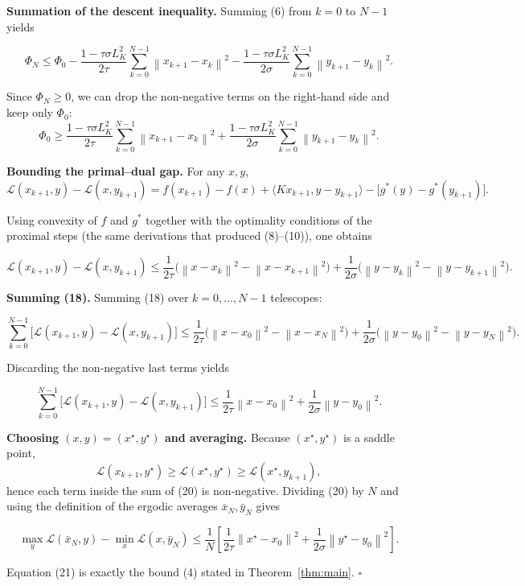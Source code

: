 \documentclass{article}
\newcommand{\norm}[1]{\left\lVert#1\right\rVert}
\begin{document}
\begin{enumerate}[label={[\arabic*]}]
\item \textbf{Summation of the descent inequality.} Summing (6) from $k=0$ to $N-1$ yields  

\[
\Phi_{N}\le \Phi_{0}
          -\frac{1-\tau\sigma L_{K}^{2}}{2\tau}\sum_{k=0}^{N-1}\norm{x_{k+1}-x_{k}}^{2}
          -\frac{1-\tau\sigma L_{K}^{2}}{2\sigma}\sum_{k=0}^{N-1}\norm{y_{k+1}-y_{k}}^{2}.
\tag{15}
\]

Since $\Phi_{N}\ge0$, we can drop the non‑negative terms on the right‑hand side and keep only $\Phi_{0}$:
\[
\Phi_{0}\ge \frac{1-\tau\sigma L_{K}^{2}}{2\tau}\sum_{k=0}^{N-1}\norm{x_{k+1}-x_{k}}^{2}
          +\frac{1-\tau\sigma L_{K}^{2}}{2\sigma}\sum_{k=0}^{N-1}\norm{y_{k+1}-y_{k}}^{2}.
\tag{16}
\]

\item \textbf{Bounding the primal–dual gap.} For any $x,y$,
\[
\mathcal L(x_{k+1},y)-\mathcal L(x,y_{k+1})
= f(x_{k+1})-f(x)+\langle Kx_{k+1},y-y_{k+1}\rangle
   -\bigl[g^{*}(y)-g^{*}(y_{k+1})\bigr].
\tag{17}
\]

Using convexity of $f$ and $g^{*}$ together with the optimality conditions of the proximal steps (the same derivations that produced (8)–(10)), one obtains  

\[
\mathcal L(x_{k+1},y)-\mathcal L(x,y_{k+1})
\le \frac{1}{2\tau}\bigl(\norm{x-x_{k}}^{2}-\norm{x-x_{k+1}}^{2}\bigr)
   +\frac{1}{2\sigma}\bigl(\norm{y-y_{k}}^{2}-\norm{y-y_{k+1}}^{2}\bigr).
\tag{18}
\]

\item \textbf{Summing (18).} Summing (18) over $k=0,\dots,N-1$ telescopes:  

\[
\sum_{k=0}^{N-1}\bigl[\mathcal L(x_{k+1},y)-\mathcal L(x,y_{k+1})\bigr]
\le \frac{1}{2\tau}\bigl(\norm{x-x_{0}}^{2}-\norm{x-x_{N}}^{2}\bigr)
   +\frac{1}{2\sigma}\bigl(\norm{y-y_{0}}^{2}-\norm{y-y_{N}}^{2}\bigr).
\tag{19}
\]

Discarding the non‑negative last terms yields  

\[
\sum_{k=0}^{N-1}\bigl[\mathcal L(x_{k+1},y)-\mathcal L(x,y_{k+1})\bigr]
\le \frac{1}{2\tau}\norm{x-x_{0}}^{2}
   +\frac{1}{2\sigma}\norm{y-y_{0}}^{2}.
\tag{20}
\]

\item \textbf{Choosing $(x,y)=(x^{\star},y^{\star})$ and averaging.} Because $(x^{\star},y^{\star})$ is a saddle point,
\[
\mathcal L(x_{k+1},y^{\star})\ge \mathcal L(x^{\star},y^{\star})\ge\mathcal L(x^{\star},y_{k+1}),
\]
hence each term inside the sum of (20) is non‑negative. Dividing (20) by $N$ and using the definition of the ergodic averages $\bar x_{N},\bar y_{N}$ gives  

\[
\max_{y}\mathcal L(\bar x_{N},y)-\min_{x}\mathcal L(x,\bar y_{N})
\le \frac{1}{N}\left[\frac{1}{2\tau}\norm{x^{\star}-x_{0}}^{2}
   +\frac{1}{2\sigma}\norm{y^{\star}-y_{0}}^{2}\right].
\tag{21}
\]

Equation (21) is exactly the bound (4) stated in Theorem~\ref{thm:main}. \hfill $\square$
\end{enumerate}
\end{document}
